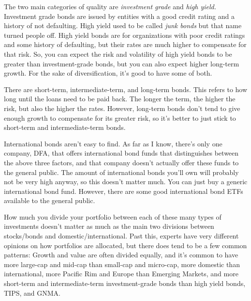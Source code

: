 The two main categories of quality are \emph{investment grade} and \emph{high yield.} Investment grade bonds are issued by entities with a good credit rating and a history of not defaulting. High yield used to be called \emph{junk bonds} but that name turned people off. High yield bonds are for organizations with poor credit ratings and some history of defaulting, but their rates are much higher to compensate for that risk. So, you can expect the risk and volatility of high yield bonds to be greater than investment-grade bonds, but you can also expect higher long-term growth. For the sake of diversification, it's good to have some of both.

There are short-term, intermediate-term, and long-term bonds. This refers to how long until the loans need to be paid back. The longer the term, the higher the risk, but also the higher the rates. However, long-term bonds don't tend to give enough growth to compensate for its greater risk, so it's better to just stick to short-term and intermediate-term bonds.

International bonds aren't easy to find. As far as I know, there's only one company, DFA, that offers international bond funds that distinguishes between the above three factors, and that company doesn't actually offer these funds to the general public. The amount of international bonds you'll own will probably not be very high anyway, so this doesn't matter much. You can just buy a generic international bond fund. However, there are some good international bond ETFs available to the general public.

How much you divide your portfolio between each of these many types of investments doesn't matter as much as the main two divisions between stocks/bonds and domestic/international. Past this, experts have very different opinions on how portfolios are allocated, but there does tend to be a few common patterns: Growth and value are often divided equally, and it's common to have more large-cap and mid-cap than small-cap and micro-cap, more domestic than international, more Pacific Rim and Europe than Emerging Markets, and more short-term and intermediate-term investment-grade bonds than high yield bonds, TIPS, and GNMA.

